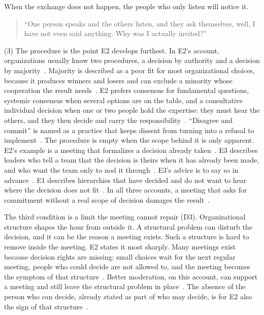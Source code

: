 When the exchange does not happen, the people who only listen will notice it.
{\setlength{\topsep}{0.25\baselineskip}\setlength{\partopsep}{0pt}%
  \begin{quote}\small
    \enquote{One person speaks and the others listen, and they ask themselves, well, I have not
    even said anything. Why was I actually invited?}~
\end{quote}}

(3) The procedure is the point E2 develops furthest.
In E2's account, organizations usually know two procedures, a decision by authority and a
decision by majority~.
Majority is described as a poor fit for most organizational choices, because it produces
winners and losers and can exclude a minority whose cooperation the result
needs~.
E2 prefers consensus for fundamental questions, systemic consensus when several options are
on the table, and a consultative individual decision when one or two people hold the
expertise: they must hear the others, and they then decide and carry the
responsibility~.
``Disagree and commit'' is named as a practice that keeps dissent from turning into a refusal
to implement~.
The procedure is empty when the scope behind it is only apparent.
E2's example is a meeting that formalizes a decision already taken~.
E3 describes leaders who tell a team that the decision is theirs when it has already been
made, and who want the team only to nod it through~.
E3's advice is to say so in advance~.
E1 describes hierarchies that have decided and do not want to hear where the decision does
not fit~.
In all three accounts, a meeting that asks for commitment without a real scope of decision
damages the result~.

The third condition is a limit the meeting cannot repair (D3).
Organizational structure shapes the hour from outside it.
A structural problem can disturb the decision, and it can be the reason a meeting exists.
Such a structure is hard to remove inside the meeting.
E2 states it most sharply.
Many meetings exist because decision rights are missing: small choices wait for the next
regular meeting, people who could decide are not allowed to, and the meeting becomes the
symptom of that structure~.
Better moderation, on this account, can support a meeting and still leave the structural
problem in place~.
The absence of the person who can decide, already stated as part of who may decide, is for E2
also the sign of that structure~.


